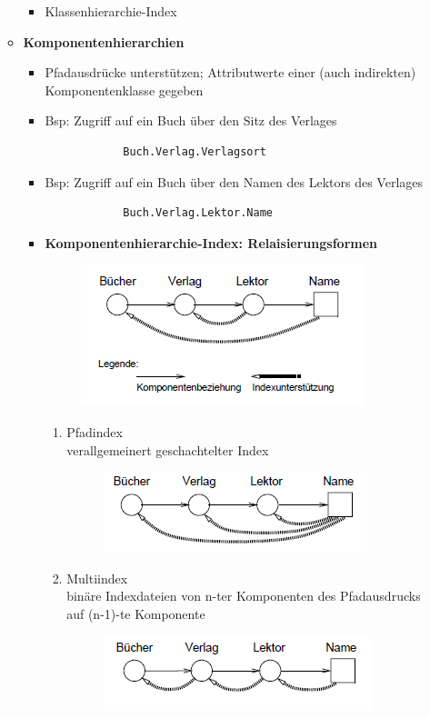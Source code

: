 \begin{itemize}
\begin{itemize}
\begin{itemize}
			\item Klassenhierarchie-Index
		\end{itemize}
		\item \textbf{Komponentenhierarchien}
		\begin{itemize}
			\item Pfadausdrücke unterstützen; Attributwerte einer (auch indirekten) Komponentenklasse gegeben
			\item Bsp: Zugriff auf ein Buch über den Sitz des Verlages
			\begin{lstlisting}
			Buch.Verlag.Verlagsort
			\end{lstlisting}
			\item Bsp: Zugriff auf ein Buch über den Namen des Lektors des Verlages
			\begin{lstlisting}
			Buch.Verlag.Lektor.Name
			\end{lstlisting}
			\item \textbf{Komponentenhierarchie-Index: Relaisierungsformen}
			\begin{figure}[!h]
				\centering
				\includegraphics[scale=0.7]{img/index_legend.png}
			\end{figure}
			\begin{enumerate}
				\item Pfadindex\\
				verallgemeinert geschachtelter Index
				\begin{figure}[!h]
					\centering
					\includegraphics[scale=0.7]{img/path_index.png}
				\end{figure}
				\item Multiindex\\
				binäre Indexdateien von n-ter Komponenten des Pfadausdrucks auf (n-1)-te Komponente
				\begin{figure}[!h]
					\centering
					\includegraphics[scale=0.7]{img/multi_index.png}

\end{figure}
\end{enumerate}
\end{itemize}
\end{itemize}
\end{itemize}
